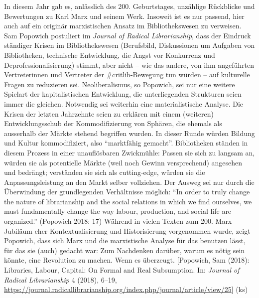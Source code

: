 \documentclass[a4paper,
fontsize=11pt,
oneside,
numbers=noperiodatend,
parskip=half-,
bibliography=totoc,
final
]{scrartcl}
\begin{document}
In diesem Jahr gab es, anlässlich des 200. Geburtstages, unzählige
Rückblicke und Bewertungen zu Karl Marx und seinem Werk. Insoweit ist es
nur passend, hier auch auf ein originär marxistischen Ansatz im
Bibliothekswesen zu verweisen. Sam Popowich postuliert im \emph{Journal
of Radical Librarianship}, dass der Eindruck ständiger Krisen im
Bibliothekswesen (Berufsbild, Diskussionen um Aufgaben von Bibliotheken,
technische Entwicklung, die Angst vor Konkurrenz und
Deprofessionalisierung) stimmt, aber nicht -- wie das andere, von ihm
angeführten Vertreterinnen und Vertreter der \#critlib-Bewegung tun
würden -- auf kulturelle Fragen zu reduzieren sei. Neoliberalismus, so
Popowich, sei nur eine weitere Spielart der kapitalistischen
Entwicklung, die unterliegenden Strukturen seien immer die gleichen.
Notwendig sei weiterhin eine materialistische Analyse. Die Krisen der
letzten Jahrzehnte seien zu erklären mit einem (weiteren)
Entwicklungsschub der Kommodifizierung von Sphären, die ehemals als
ausserhalb der Märkte stehend begriffen wurden. In dieser Runde würden
Bildung und Kultur kommodifiziert, also \enquote{marktfähig gemacht}.
Bibliotheken ständen in diesem Prozess in einer unauflösbaren
Zwickmühle: Passen sie sich zu langsam an, würden sie als potentielle
Märkte (weil noch Gewinn versprechend) angesehen und bedrängt;
verständen sie sich als cutting-edge, würden sie die Anpassungsleistung
an den Markt selber vollziehen. Der Ausweg sei nur durch die Überwindung
der grundlegenden Verhältnisse möglich: \enquote{In order to truly
change the nature of librarianship and the social relations in which we
find ourselves, we must fundamentally change the way labour, production,
and social life are organized.} (Popowich 2018: 17) Während in vielen
Texten zum 200. Marx-Jubiläum eher Kontextualisierung und Historisierung
vorgenommen wurde, zeigt Popowich, dass sich Marx und die marxistische
Analyse für das benutzen lässt, für das sie (auch) gedacht war: Zum
Nachdenken darüber, warum es nötig sein könnte, eine Revolution zu
machen. Wenn es überzeugt. {[}Popowich, Sam (2018): Libraries, Labour,
Capital: On Formal and Real Subsumption. In: \emph{Journal of Radical
Librarianship} 4 (2018), 6--19,
\url{https://journal.radicallibrarianship.org/index.php/journal/article/view/25}{]}
(ks)
\end{document}
